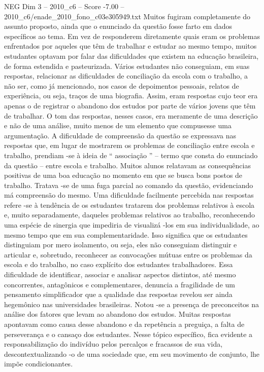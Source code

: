 \begin{textsample}{NEG Dim 3 – 2010\_c6 – Score -7.00 – 2010\_c6/enade\_2010\_fono\_c03e305949.txt}
Muitos fugiram completamente do assunto proposto, ainda que o enunciado da questão fosse farto em dados específicos ao tema.
Em vez de responderem diretamente quais eram os problemas enfrentados por aqueles que têm de trabalhar e estudar ao mesmo tempo, muitos estudantes optavam por falar das dificuldades que existem na educação brasileira, de forma estendida e pasteurizada.
Vários estudantes não conseguiam, em suas respostas, relacionar as dificuldades de conciliação da escola com o trabalho, a não ser, como já mencionado, nos casos de depoimentos pessoais, relatos de experiência, ou seja, traços de uma biografia.
Assim, eram respostas cujo teor era apenas o de registrar o abandono dos estudos por parte de vários jovens que têm de trabalhar.
O tom das respostas, nesses casos, era meramente de uma descrição e não de uma análise, muito menos de um elemento que compusesse uma argumentação.
A dificuldade de compreensão da questão se expressava nas respostas que, em lugar de mostrarem os problemas de conciliação entre escola e trabalho, prendiam -se à ideia de “ associação ” – termo que consta do enunciado da questão – entre escola e trabalho.
Muitos alunos relatavam as consequências positivas de uma boa educação no momento em que se busca bons postos de trabalho.
Tratava -se de uma fuga parcial ao comando da questão, evidenciando má compreensão do mesmo.
Uma dificuldade facilmente percebida nas respostas refere -se à tendência de os estudantes tratarem dos problemas relativos à escola e, muito separadamente, daqueles problemas relativos ao trabalho, reconhecendo uma espécie de sinergia que impediria de visualizá -los em sua individualidade, ao mesmo tempo que em sua complementaridade.
Isso significa que os estudantes distinguiam por mero isolamento, ou seja, eles não conseguiam distinguir e articular e, sobretudo, reconhecer as convocações mútuas entre os problemas da escola e do trabalho, no caso explícito dos estudantes trabalhadores.
Essa dificuldade de identificar, associar e analisar aspectos distintos, até mesmo concorrentes, antagônicos e complementares, denuncia a fragilidade de um pensamento simplificador que a qualidade das respostas revelou ser ainda hegemônico nas universidades brasileiras.
Notou -se a presença de preconceitos na análise dos fatores que levam ao abandono dos estudos.
Muitas respostas apontavam como causa desse abandono e da repetência a preguiça, a falta de perseverança e o cansaço dos estudantes.
Nesse tópico específico, fica evidente a responsabilização do indivíduo pelos percalços e fracassos de sua vida, descontextualizando -o de uma sociedade que, em seu movimento de conjunto, lhe impõe condicionantes.

\end{textsample}
